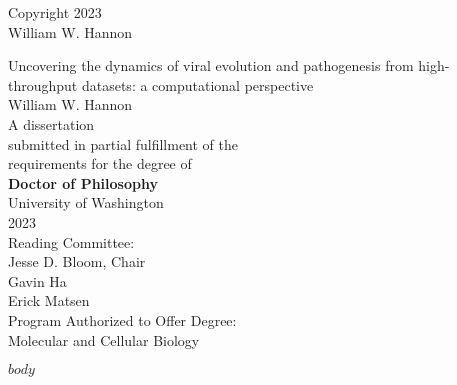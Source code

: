 \documentclass[12pt,oneside,letterpaper]{report}
\begin{document}
\thispagestyle{empty}
\begin{center}
\textcopyright{} Copyright 2023 \\
William W. Hannon
\end{center}
\vspace*{\fill}
\newpage

\begin{singlespace}
\thispagestyle{empty}
\begin{center}
\huge{Uncovering the dynamics of viral evolution and pathogenesis from high-throughput datasets: a computational perspective} \\
\vspace{2cm}
\Large{William W. Hannon} \\
\vspace{2cm}
A dissertation \\
submitted in partial fulfillment of the \\
requirements for the degree of \\
\vspace{1cm}
\textbf{Doctor of Philosophy} \\
\vspace{1cm}
University of Washington \\
2023 \\
\vspace{1cm}
Reading Committee: \\
Jesse D. Bloom, Chair \\
Gavin Ha \\
Erick Matsen \\
\vspace{1cm}
Program Authorized to Offer Degree: \\
Molecular and Cellular Biology
\end{center}
\end{singlespace}
\newpage


\newpage

\tableofcontents
\newpage



\newpage

$body$
\newpage



\end{document}
